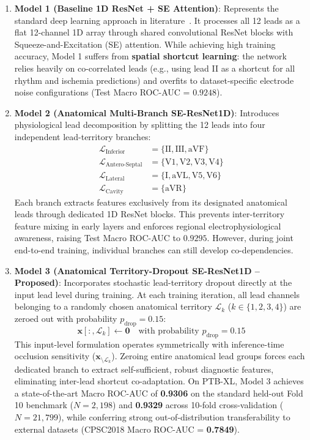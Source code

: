 \documentclass[5p,twocolumn,10pt]{elsarticle}
\begin{document}
\begin{enumerate}
    \item \textbf{Model 1 (Baseline 1D ResNet + SE Attention)}: Represents the standard deep learning approach in literature~\cite{strodthoff2020deep}. It processes all 12 leads as a flat 12-channel 1D array through shared convolutional ResNet blocks with Squeeze-and-Excitation (SE) attention. While achieving high training accuracy, Model 1 suffers from \textbf{spatial shortcut learning}: the network relies heavily on co-correlated leads (e.g., using lead II as a shortcut for all rhythm and ischemia predictions) and overfits to dataset-specific electrode noise configurations (Test Macro ROC-AUC = $0.9248$).
    
    \item \textbf{Model 2 (Anatomical Multi-Branch SE-ResNet1D)}: Introduces physiological lead decomposition by splitting the 12 leads into four independent lead-territory branches:
    \begin{align}
    \mathcal{L}_{\text{Inferior}} &= \{\text{II}, \text{III}, \text{aVF}\} \\
    \mathcal{L}_{\text{Antero-Septal}} &= \{\text{V1}, \text{V2}, \text{V3}, \text{V4}\} \\
    \mathcal{L}_{\text{Lateral}} &= \{\text{I}, \text{aVL}, \text{V5}, \text{V6}\} \\
    \mathcal{L}_{\text{Cavity}} &= \{\text{aVR}\}
    \end{align}
    Each branch extracts features exclusively from its designated anatomical leads through dedicated 1D ResNet blocks. This prevents inter-territory feature mixing in early layers and enforces regional electrophysiological awareness, raising Test Macro ROC-AUC to $0.9295$. However, during joint end-to-end training, individual branches can still develop co-dependencies.
    
    \item \textbf{Model 3 (Anatomical Territory-Dropout SE-ResNet1D -- Proposed)}: Incorporates stochastic lead-territory dropout directly at the input lead level during training. At each training iteration, all lead channels belonging to a randomly chosen anatomical territory $\mathcal{L}_k$ ($k \in \{1, 2, 3, 4\}$) are zeroed out with probability $p_{\text{drop}} = 0.15$:
    \begin{equation}
    \mathbf{x}[:, \mathcal{L}_k] \leftarrow \mathbf{0} \quad \text{with probability } p_{\text{drop}} = 0.15
    \end{equation}
    This input-level formulation operates symmetrically with inference-time occlusion sensitivity ($\mathbf{x}_{\setminus \mathcal{L}_k}$). Zeroing entire anatomical lead groups forces each dedicated branch to extract self-sufficient, robust diagnostic features, eliminating inter-lead shortcut co-adaptation. On PTB-XL, Model 3 achieves a state-of-the-art Macro ROC-AUC of \textbf{0.9306} on the standard held-out Fold 10 benchmark ($N=2,198$) and \textbf{0.9329} across 10-fold cross-validation ($N=21,799$), while conferring strong out-of-distribution transferability to external datasets (CPSC2018 Macro ROC-AUC = \textbf{0.7849}).
\end{enumerate}
\end{document}
